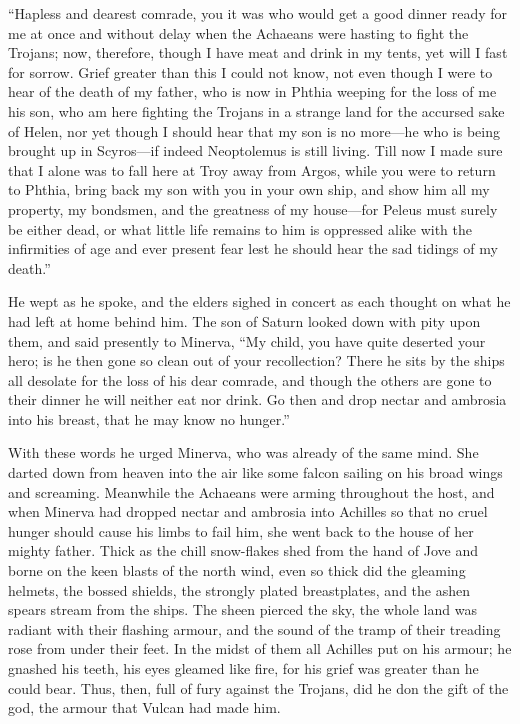 “Hapless and dearest comrade, you it was who would get a good dinner ready
for me at once and without delay when the Achaeans were hasting to fight
the Trojans; now, therefore, though I have meat and drink in my tents, yet
will I fast for sorrow. Grief greater than this I could not know, not even
though I were to hear of the death of my father, who is now in Phthia
weeping for the loss of me his son, who am here fighting the Trojans in a
strange land for the accursed sake of Helen, nor yet though I should hear
that my son is no more—he who is being brought up in Scyros—if
indeed Neoptolemus is still living. Till now I made sure that I alone was
to fall here at Troy away from Argos, while you were to return to Phthia,
bring back my son with you in your own ship, and show him all my property,
my bondsmen, and the greatness of my house—for Peleus must surely be
either dead, or what little life remains to him is oppressed alike with
the infirmities of age and ever present fear lest he should hear the sad
tidings of my death.”

He wept as he spoke, and the elders sighed in concert as each thought on
what he had left at home behind him. The son of Saturn looked down with
pity upon them, and said presently to Minerva, “My child, you have quite
deserted your hero; is he then gone so clean out of your recollection?
There he sits by the ships all desolate for the loss of his dear comrade,
and though the others are gone to their dinner he will neither eat nor
drink. Go then and drop nectar and ambrosia into his breast, that he may
know no hunger.”

With these words he urged Minerva, who was already of the same mind. She
darted down from heaven into the air like some falcon sailing on his broad
wings and screaming. Meanwhile the Achaeans were arming throughout the
host, and when Minerva had dropped nectar and ambrosia into Achilles so
that no cruel hunger should cause his limbs to fail him, she went back to
the house of her mighty father. Thick as the chill snow-flakes shed from
the hand of Jove and borne on the keen blasts of the north wind, even so
thick did the gleaming helmets, the bossed shields, the strongly plated
breastplates, and the ashen spears stream from the ships. The sheen
pierced the sky, the whole land was radiant with their flashing armour,
and the sound of the tramp of their treading rose from under their feet.
In the midst of them all Achilles put on his armour; he gnashed his teeth,
his eyes gleamed like fire, for his grief was greater than he could bear.
Thus, then, full of fury against the Trojans, did he don the gift of the
god, the armour that Vulcan had made him.

